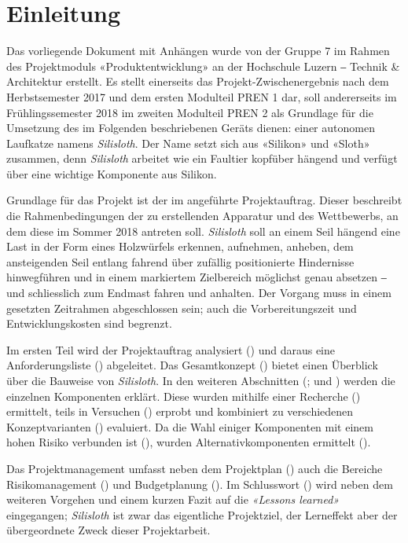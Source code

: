 \section{Einleitung}

Das vorliegende Dokument mit Anhängen wurde von der Gruppe 7 im Rahmen des Projektmoduls «Produktentwicklung» an der Hochschule Luzern ‒ Technik \& Architektur erstellt. Es stellt einerseits das Projekt-Zwischenergebnis nach dem Herbstsemester 2017 und dem ersten Modulteil PREN 1 dar, soll andererseits im Frühlingssemester 2018 im zweiten Modulteil PREN 2 als Grundlage für die Umsetzung des im Folgenden beschriebenen Geräts dienen: einer autonomen Laufkatze namens \textit{Silisloth}. Der Name setzt sich aus «Silikon» und «Sloth» zusammen, denn \textit{Silisloth} arbeitet wie ein Faultier kopfüber hängend und verfügt über eine wichtige Komponente aus Silikon.

Grundlage für das Projekt ist der im  angeführte Projektauftrag. Dieser beschreibt die Rahmenbedingungen der zu erstellenden Apparatur und des Wettbewerbs, an dem diese im Sommer 2018 antreten soll. \textit{Silisloth} soll an einem Seil hängend eine Last in der Form eines Holzwürfels erkennen, aufnehmen, anheben, dem ansteigenden Seil entlang fahrend über zufällig positionierte Hindernisse hinwegführen und in einem markiertem Zielbereich möglichst genau absetzen ‒ und schliesslich zum Endmast fahren und anhalten. Der Vorgang muss in einem gesetzten Zeitrahmen abgeschlossen sein; auch die Vorbereitungszeit und Entwicklungskosten sind begrenzt.

Im ersten Teil wird der Projektauftrag analysiert () und daraus eine Anforderungsliste () abgeleitet. Das Gesamtkonzept () bietet einen Überblick über die Bauweise von \textit{Silisloth}. In den weiteren Abschnitten (;  und ) werden die einzelnen Komponenten erklärt. Diese wurden mithilfe einer Recherche () ermittelt, teils in Versuchen () erprobt und kombiniert zu verschiedenen Konzeptvarianten () evaluiert. Da die Wahl einiger Komponenten mit einem hohen Risiko verbunden ist (), wurden Alternativkomponenten ermittelt ().

Das Projektmanagement umfasst neben dem Projektplan () auch die Bereiche Risikomanagement () und Budgetplanung (). Im Schlusswort () wird neben dem weiteren Vorgehen und einem kurzen Fazit auf die \textit{«Lessons learned»} eingegangen; \textit{Silisloth} ist zwar das eigentliche Projektziel, der Lerneffekt aber der übergeordnete Zweck dieser Projektarbeit.

